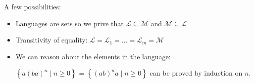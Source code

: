 \noindent
A few possibilities:
\begin{itemize}
    \item Languages are sets so we prive that $\mathcal{L} \subseteq \mathcal{M}$ and $\mathcal{M} \subseteq \mathcal{L}$
    \item Transitivity of equality: $\mathcal{L} = \mathcal{L}_1 = ... = \mathcal{L}_m = \mathcal{M}$
    \item We can reason about the elements in the language:
    \begin{Ex}
        $\left\{ a(ba)^n \mid n \ge 0 \right\}$ = $\left\{ (ab)^na \mid n \ge 0 \right\}$ can be proved by induction on $n.$
    \end{Ex}
\end{itemize}

